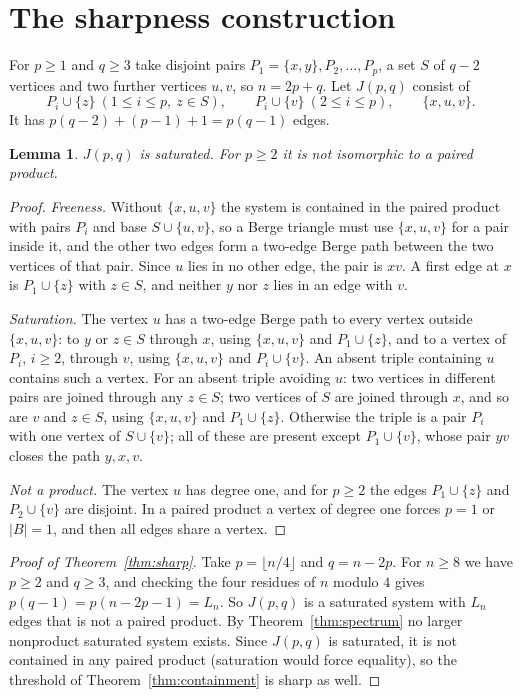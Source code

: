 \documentclass[11pt]{article}
\newtheorem{lemma}[theorem]{Lemma}
\theoremstyle{remark}
\begin{document}
\section{The sharpness construction}

For $p\ge1$ and $q\ge3$ take disjoint pairs $P_1=\{x,y\},P_2,\dots,P_p$, a
set $S$ of $q-2$ vertices and two further vertices $u,v$, so $n=2p+q$. Let
$J(p,q)$ consist of
\[
P_i\cup\{z\}\ (1\le i\le p,\ z\in S),\qquad
P_i\cup\{v\}\ (2\le i\le p),\qquad \{x,u,v\}.
\]
It has $p(q-2)+(p-1)+1=p(q-1)$ edges.

\begin{lemma}\label{lem:J}
$J(p,q)$ is saturated. For $p\ge2$ it is not isomorphic to a paired product.
\end{lemma}

\begin{proof}
\emph{Freeness.} Without $\{x,u,v\}$ the system is contained in the paired
product with pairs $P_i$ and base $S\cup\{u,v\}$, so a Berge triangle must
use $\{x,u,v\}$ for a pair inside it, and the other two edges form a
two-edge Berge path between the two vertices of that pair. Since $u$ lies
in no other edge, the pair is $xv$. A first edge at $x$ is $P_1\cup\{z\}$
with $z\in S$, and neither $y$ nor $z$ lies in an edge with $v$.

\emph{Saturation.} The vertex $u$ has a two-edge Berge path to every vertex
outside $\{x,u,v\}$: to $y$ or $z\in S$ through $x$, using $\{x,u,v\}$ and
$P_1\cup\{z\}$, and to a vertex of $P_i$, $i\ge2$, through $v$, using
$\{x,u,v\}$ and $P_i\cup\{v\}$. An absent triple containing $u$ contains
such a vertex. For an absent triple avoiding $u$: two vertices in different
pairs are joined through any $z\in S$; two vertices of $S$ are joined
through $x$, and so are $v$ and $z\in S$, using $\{x,u,v\}$ and
$P_1\cup\{z\}$. Otherwise the triple is a pair $P_i$ with one vertex of
$S\cup\{v\}$; all of these are present except $P_1\cup\{v\}$, whose pair
$yv$ closes the path $y,x,v$.

\emph{Not a product.} The vertex $u$ has degree one, and for $p\ge2$ the
edges $P_1\cup\{z\}$ and $P_2\cup\{v\}$ are disjoint. In a paired product a
vertex of degree one forces $p=1$ or $|B|=1$, and then all edges share a
vertex.
\end{proof}

\begin{proof}[Proof of Theorem~\ref{thm:sharp}]
Take $p=\lfloor n/4\rfloor$ and $q=n-2p$. For $n\ge8$ we have $p\ge2$ and
$q\ge3$, and checking the four residues of $n$ modulo $4$ gives
$p(q-1)=p(n-2p-1)=L_n$. So $J(p,q)$ is a saturated system with $L_n$ edges
that is not a paired product. By Theorem~\ref{thm:spectrum} no larger
nonproduct saturated system exists. Since $J(p,q)$ is saturated, it is not
contained in any paired product (saturation would force equality), so the
threshold of Theorem~\ref{thm:containment} is sharp as well.
\end{proof}
\end{document}
